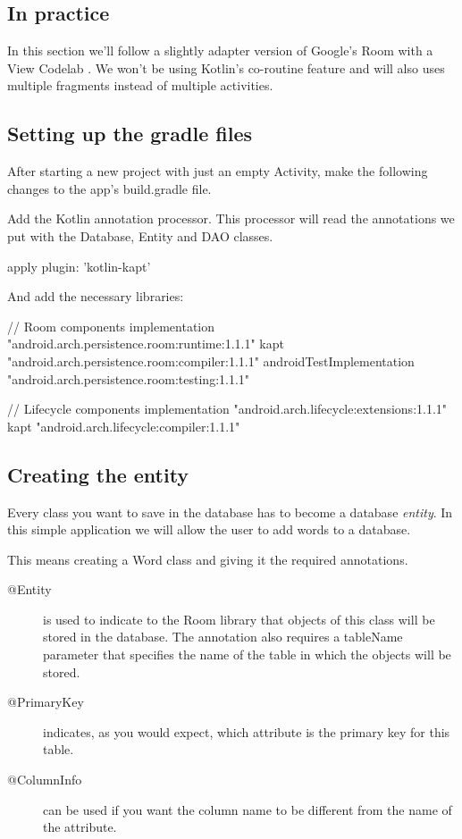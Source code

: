 \subsection{In practice}
In this section we'll follow a slightly adapter version of Google's Room with a View Codelab \cite{RoomWithAView}.
We won't be using Kotlin's co-routine feature and will also uses multiple fragments instead of multiple activities. 


\subsection{Setting up the gradle files}
After starting a new project with just an empty Activity, make the following changes to the app's build.gradle file.

Add the Kotlin annotation processor.
This processor will read the annotations we put with the Database, Entity and DAO classes.
\begin{android}
	apply plugin: 'kotlin-kapt'
\end{android}

And add the necessary libraries:
\begin{android}
// Room components
implementation "android.arch.persistence.room:runtime:1.1.1"
kapt "android.arch.persistence.room:compiler:1.1.1"
androidTestImplementation "android.arch.persistence.room:testing:1.1.1"

// Lifecycle components
implementation "android.arch.lifecycle:extensions:1.1.1"
kapt "android.arch.lifecycle:compiler:1.1.1"
\end{android}

\subsection{Creating the entity}
Every class you want to save in the database has to become a database \textit{entity}.
In this simple application we will allow the user to add words to a database.

This means creating a Word class and giving it the required annotations.
\begin{description}
	\item[@Entity] is used to indicate to the Room library that objects of this class will be stored in the database.
	The annotation also requires a tableName parameter that specifies the name of the table in which the objects will be stored.
	\item[@PrimaryKey] indicates, as you would expect, which attribute is the primary key for this table.
	\item[@ColumnInfo] can be used if you want the column name to be different from the name of the attribute.
\end{description}

